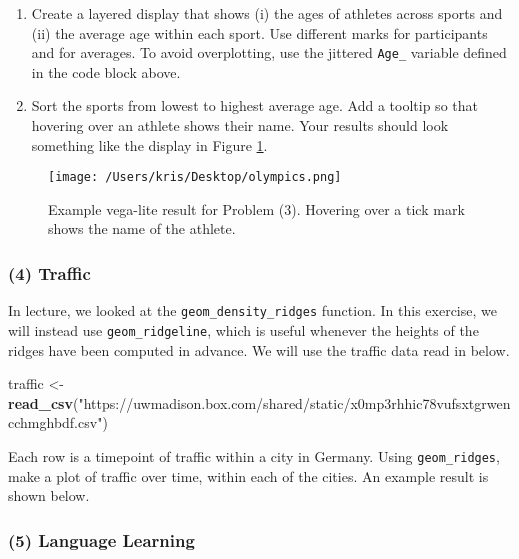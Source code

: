 \documentclass[
]{article}
\newenvironment{Shaded}{\begin{snugshade}}{\end{snugshade}}
\newcommand{\KeywordTok}[1]{\textcolor[rgb]{0.13,0.29,0.53}{\textbf{#1}}}
\newcommand{\NormalTok}[1]{#1}
\newcommand{\StringTok}[1]{\textcolor[rgb]{0.31,0.60,0.02}{#1}}
\begin{document}
\begin{enumerate}
\def\labelenumi{\alph{enumi}.}
\item
  Create a layered display that shows (i) the ages of athletes across
  sports and (ii) the average age within each sport. Use different marks
  for participants and for averages. To avoid overplotting, use the
  jittered \texttt{Age\_} variable defined in the code block above.
\item
  Sort the sports from lowest to highest average age. Add a tooltip so
  that hovering over an athlete shows their name. Your results should
  look something like the display in Figure \ref{fig:3}.
\end{enumerate}

\begin{figure}
  \centering
  \texttt{[image: /Users/kris/Desktop/olympics.png]}
  \caption{Example vega-lite result for Problem (3). Hovering over a tick mark
  shows the name of the athlete.}
  \label{fig:3}
\end{figure}

\hypertarget{traffic}{%
\subsubsection{(4) Traffic}\label{traffic}}

In lecture, we looked at the \texttt{geom\_density\_ridges} function. In
this exercise, we will instead use \texttt{geom\_ridgeline}, which is
useful whenever the heights of the ridges have been computed in advance.
We will use the traffic data read in below.

\begin{Shaded}
\begin{Highlighting}[]
\NormalTok{traffic <-}\StringTok{ }\KeywordTok{read_csv}\NormalTok{(}\StringTok{"https://uwmadison.box.com/shared/static/x0mp3rhhic78vufsxtgrwencchmghbdf.csv"}\NormalTok{)}
\end{Highlighting}
\end{Shaded}

Each row is a timepoint of traffic within a city in Germany. Using
\texttt{geom\_ridges}, make a plot of traffic over time, within each of
the cities. An example result is shown below.

\hypertarget{language-learning}{%
\subsubsection{(5) Language Learning}\label{language-learning}}
\end{document}
